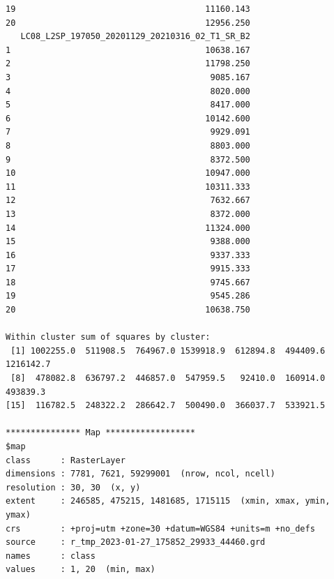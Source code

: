 \documentclass[remotesensing,article,submit,pdftex,moreauthors]{Definitions/mdpi}
\begin{document}
\begin{scriptsize}
\begin{verbatim}
19                                      11160.143
20                                      12956.250
   LC08_L2SP_197050_20201129_20210316_02_T1_SR_B2
1                                       10638.167
2                                       11798.250
3                                        9085.167
4                                        8020.000
5                                        8417.000
6                                       10142.600
7                                        9929.091
8                                        8803.000
9                                        8372.500
10                                      10947.000
11                                      10311.333
12                                       7632.667
13                                       8372.000
14                                      11324.000
15                                       9388.000
16                                       9337.333
17                                       9915.333
18                                       9745.667
19                                       9545.286
20                                      10638.750

Within cluster sum of squares by cluster:
 [1] 1002255.0  511908.5  764967.0 1539918.9  612894.8  494409.6 1216142.7
 [8]  478082.8  636797.2  446857.0  547959.5   92410.0  160914.0  493839.3
[15]  116782.5  248322.2  286642.7  500490.0  366037.7  533921.5

*************** Map ******************
$map
class      : RasterLayer 
dimensions : 7781, 7621, 59299001  (nrow, ncol, ncell)
resolution : 30, 30  (x, y)
extent     : 246585, 475215, 1481685, 1715115  (xmin, xmax, ymin, ymax)
crs        : +proj=utm +zone=30 +datum=WGS84 +units=m +no_defs 
source     : r_tmp_2023-01-27_175852_29933_44460.grd 
names      : class 
values     : 1, 20  (min, max)
\end{verbatim}
\end{scriptsize}
\end{document}
